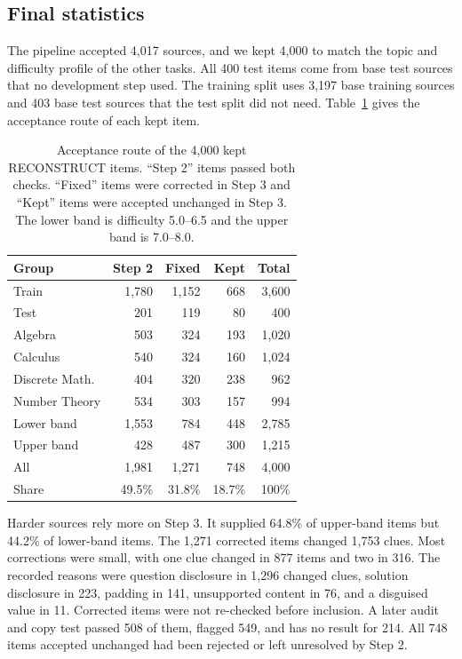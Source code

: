 \documentclass[11pt]{article}
\begin{document}
\subsection{Final statistics}

The pipeline accepted 4,017 sources, and we kept 4,000 to match the topic and difficulty profile of the other tasks. All 400 test items come from base test sources that no development step used. The training split uses 3,197 base training sources and 403 base test sources that the test split did not need. Table~\ref{tab:recon-routes} gives the acceptance route of each kept item.

\begin{table}[t]
\centering
\small
\setlength{\tabcolsep}{3.5pt}
\begin{tabular}{lrrrr}
\toprule
Group & Step 2 & Fixed & Kept & Total \\
\midrule
Train & 1,780 & 1,152 & 668 & 3,600 \\
Test & 201 & 119 & 80 & 400 \\
\midrule
Algebra & 503 & 324 & 193 & 1,020 \\
Calculus & 540 & 324 & 160 & 1,024 \\
Discrete Math. & 404 & 320 & 238 & 962 \\
Number Theory & 534 & 303 & 157 & 994 \\
\midrule
Lower band & 1,553 & 784 & 448 & 2,785 \\
Upper band & 428 & 487 & 300 & 1,215 \\
\midrule
All & 1,981 & 1,271 & 748 & 4,000 \\
Share & 49.5\% & 31.8\% & 18.7\% & 100\% \\
\bottomrule
\end{tabular}
\caption{Acceptance route of the 4,000 kept RECONSTRUCT items. ``Step 2'' items passed both checks. ``Fixed'' items were corrected in Step 3 and ``Kept'' items were accepted unchanged in Step 3. The lower band is difficulty 5.0--6.5 and the upper band is 7.0--8.0.}
\label{tab:recon-routes}
\end{table}

Harder sources rely more on Step 3. It supplied 64.8\% of upper-band items but 44.2\% of lower-band items. The 1,271 corrected items changed 1,753 clues. Most corrections were small, with one clue changed in 877 items and two in 316. The recorded reasons were question disclosure in 1,296 changed clues, solution disclosure in 223, padding in 141, unsupported content in 76, and a disguised value in 11. Corrected items were not re-checked before inclusion. A later audit and copy test passed 508 of them, flagged 549, and has no result for 214. All 748 items accepted unchanged had been rejected or left unresolved by Step 2.
\end{document}
